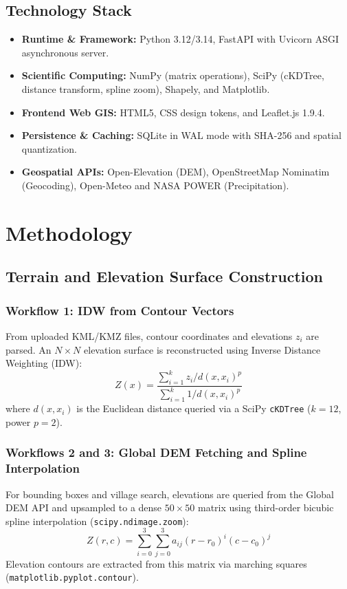 \documentclass[manuscript,screen,review]{acmart}
\begin{document}
\subsection{Technology Stack}
\begin{itemize}
    \item \textbf{Runtime \& Framework:} Python 3.12/3.14, FastAPI with Uvicorn ASGI asynchronous server.
    \item \textbf{Scientific Computing:} NumPy (matrix operations), SciPy (cKDTree, distance transform, spline zoom), Shapely, and Matplotlib.
    \item \textbf{Frontend Web GIS:} HTML5, CSS design tokens, and Leaflet.js 1.9.4.
    \item \textbf{Persistence \& Caching:} SQLite in WAL mode with SHA-256 and spatial quantization.
    \item \textbf{Geospatial APIs:} Open-Elevation (DEM), OpenStreetMap Nominatim (Geocoding), Open-Meteo and NASA POWER (Precipitation).
\end{itemize}

\section{Methodology}
\label{sec:methodology}

\subsection{Terrain and Elevation Surface Construction}
\subsubsection{Workflow 1: IDW from Contour Vectors}
From uploaded KML/KMZ files, contour coordinates and elevations $z_i$ are parsed. An $N \times N$ elevation surface is reconstructed using Inverse Distance Weighting (IDW):
\begin{equation}
Z(x) = \frac{\sum_{i=1}^{k} z_i / d(x, x_i)^p}{\sum_{i=1}^{k} 1 / d(x, x_i)^p}
\end{equation}
where $d(x, x_i)$ is the Euclidean distance queried via a SciPy \texttt{cKDTree} ($k=12$, power $p=2$).

\subsubsection{Workflows 2 and 3: Global DEM Fetching and Spline Interpolation}
For bounding boxes and village search, elevations are queried from the Global DEM API and upsampled to a dense $50 \times 50$ matrix using third-order bicubic spline interpolation (\texttt{scipy.ndimage.zoom}):
\begin{equation}
Z(r, c) = \sum_{i=0}^{3} \sum_{j=0}^{3} a_{ij} (r - r_0)^i (c - c_0)^j
\end{equation}
Elevation contours are extracted from this matrix via marching squares (\texttt{matplotlib.pyplot.contour}).
\end{document}
